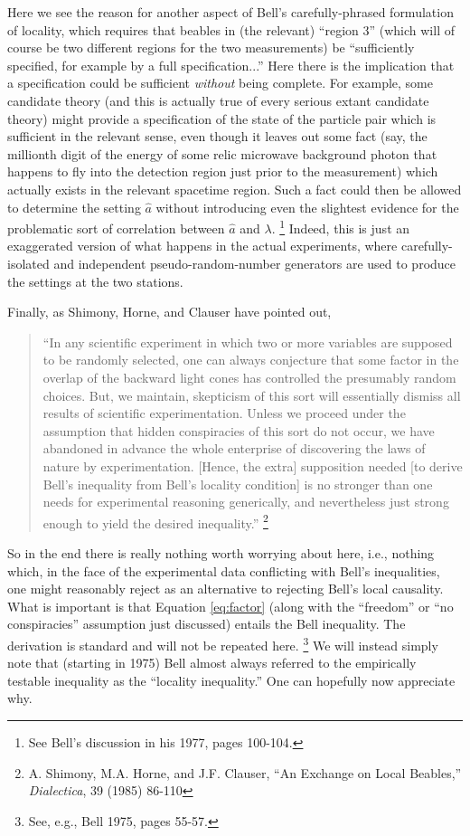 \documentclass[12pt]{article}
\begin{document}
Here we see the
reason for another aspect of Bell's carefully-phrased formulation of 
locality, which requires that beables in (the relevant) ``region 3''
(which will of course be two different regions for the two measurements)
be ``sufficiently specified, for example by a full specification...''
Here there is the implication that a
specification could be sufficient \emph{without} being complete.  For
example, some candidate theory (and this is actually true of every
serious extant candidate theory) might provide a specification of the
state of the particle pair which is sufficient in the relevant sense,
even though it leaves out some fact (say, the millionth digit of the
energy of some relic microwave background photon that happens to
fly into the detection region just prior to the measurement) which
actually exists in the relevant spacetime region.  Such a fact could
then be allowed to determine the setting $\hat{a}$ without introducing
even the slightest evidence for the problematic sort of correlation
between $\hat{a}$ and $\lambda$.%
\footnote{See Bell's discussion in his 1977, pages 100-104.}
Indeed, this is just an exaggerated
version of what happens in the actual experiments, where
carefully-isolated and independent pseudo-random-number generators are
used to produce the settings at the two stations.  

Finally, as Shimony, Horne, and Clauser have pointed out, 
\begin{quote}
``In any scientific experiment
in which two or more variables are supposed to be randomly selected,
one can always conjecture that some factor in the overlap of the
backward light cones has controlled the presumably random choices.
But, we maintain, skepticism of this sort will essentially dismiss all
results of scientific experimentation.  Unless we proceed under the
assumption that hidden conspiracies of this sort do not occur, we have
abandoned in advance the whole enterprise of discovering the laws of
nature by experimentation.   [Hence, the extra] supposition needed [to
derive Bell's inequality from Bell's locality condition] is
no stronger than one needs for experimental reasoning generically, and
nevertheless just strong enough to yield the desired inequality.''%
\footnote{A. Shimony, M.A. Horne, and J.F. Clauser, ``An Exchange on
  Local Beables,'' \emph{Dialectica}, 39 (1985) 86-110}
\end{quote}
So in the end there is really nothing worth worrying about here, i.e.,
nothing which, in the face of the experimental data conflicting with
Bell's inequalities, one might reasonably reject as an alternative to
rejecting Bell's local causality.  What
is important is that Equation \ref{eq:factor} (along with the ``freedom''
or ``no conspiracies'' assumption just discussed) entails the Bell
inequality.
The derivation is standard and will not be repeated here.  
\footnote{See, e.g., Bell 1975, pages 55-57.}
We will instead simply note
that (starting in 1975) Bell almost always referred 
to the empirically testable inequality as the ``locality inequality.''  
One can hopefully now appreciate why.
\end{document}
